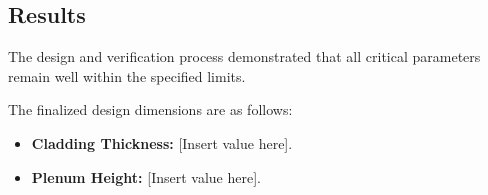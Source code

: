 \subsection{Results}

The design and verification process demonstrated that all critical parameters remain well within the specified limits. 

The finalized design dimensions are as follows:
\begin{itemize}
    \item \textbf{Cladding Thickness:} [Insert value here].
    \item \textbf{Plenum Height:} [Insert value here].
\end{itemize}
